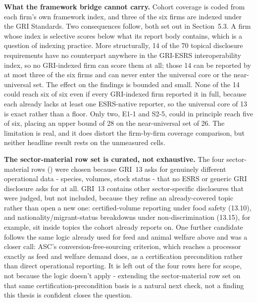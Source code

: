\documentclass[
]{article}
\begin{document}
\textbf{What the framework bridge cannot carry.} Cohort coverage is coded from
each firm's own framework index, and three of the six firms are indexed under the
GRI Standards. Two consequences follow, both set out in Section~5.3. A firm whose
index is selective scores below what its report body contains, which is a
question of indexing practice. More structurally, 14 of the 70 topical
disclosure requirements have no counterpart anywhere in the GRI-ESRS
interoperability index, so no GRI-indexed firm can score them at all; those 14
can be reported by at most three of the six firms and can never enter the
universal core or the near-universal set. The effect on the findings is bounded
and small. None of the 14 could reach six of six even if every GRI-indexed firm
reported it in full, because each already lacks at least one ESRS-native
reporter, so the universal core of 13 is exact rather than a floor. Only two,
E1-1 and S2-5, could in principle reach five of six, placing an upper bound of 28
on the near-universal set of 26. The limitation is real, and it does distort the
firm-by-firm coverage comparison, but neither headline result rests on the
unmeasured cells.

\textbf{The sector-material row set is curated, not exhaustive.} The four
sector-material rows () were chosen because GRI~13
asks for genuinely different operational data - species, volumes, stock
status - that no ESRS or generic GRI disclosure asks for at all. GRI~13
contains other sector-specific disclosures that were judged, but not
included, because they refine an already-covered topic rather than open a
new one: certified-volume reporting under food safety (13.10), and
nationality/migrant-status breakdowns under non-discrimination (13.15), for
example, sit inside topics the cohort already reports on. One further
candidate follows the same logic already used for feed and animal welfare
above and was a closer call: ASC's conversion-free-sourcing criterion, which
reaches a processor exactly as feed and welfare demand does, as a
certification precondition rather than direct operational reporting. It is
left out of the four rows here for scope, not because the logic doesn't
apply - extending the sector-material row set on that same
certification-precondition basis is a natural next check, not a finding
this thesis is confident closes the question.
\end{document}
